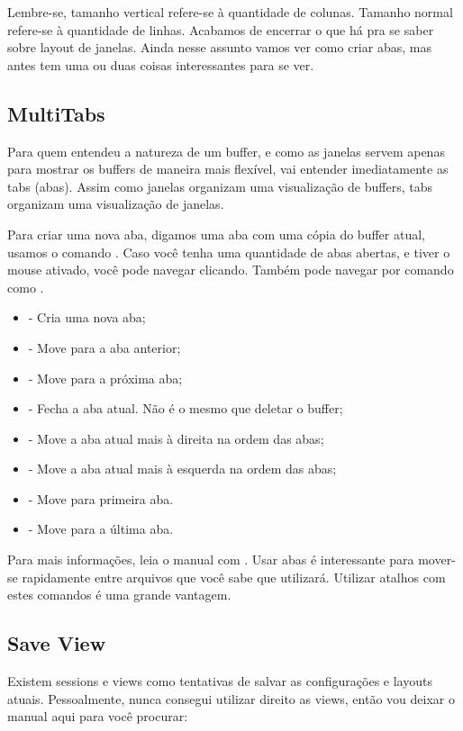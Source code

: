 Lembre-se, tamanho vertical refere-se à quantidade de colunas. Tamanho normal refere-se à quantidade de linhas.
Acabamos de encerrar o que há pra se saber sobre layout de janelas.
Ainda nesse assunto vamos ver como criar abas, mas antes tem uma ou duas coisas interessantes para se ver.

\subsection{MultiTabs}
Para quem entendeu a natureza de um buffer, e como as janelas servem apenas para mostrar os buffers
de maneira mais flexível, vai entender imediatamente as tabs (abas).
Assim como janelas organizam uma visualização de buffers, tabs organizam uma visualização de janelas.

Para criar uma nova aba, digamos uma aba com uma cópia do buffer atual, usamos o comando .
Caso você tenha uma quantidade de abas abertas, e tiver o mouse ativado, você pode navegar clicando.
Também pode navegar por comando como .

\begin{itemize}
    \item {} - Cria uma nova aba;
    \item {} - Move para a aba anterior;
    \item {} - Move para a próxima aba;
    \item {} - Fecha a aba atual. Não é o mesmo que deletar o buffer;
    \item {} - Move a aba atual mais à direita na ordem das abas;
    \item {} - Move a aba atual mais à esquerda na ordem das abas;
    \item {} - Move para primeira aba.
    \item {} - Move para a última aba.
\end{itemize}

Para mais informações, leia o manual com .
Usar abas é interessante para mover-se rapidamente entre arquivos que você sabe que utilizará.
Utilizar atalhos com estes comandos é uma grande vantagem.

\subsection{Save View}
Existem sessions e views como tentativas de salvar as configurações e layouts atuais.
Pessoalmente, nunca consegui utilizar direito as views, então vou deixar o manual aqui para você procurar:

